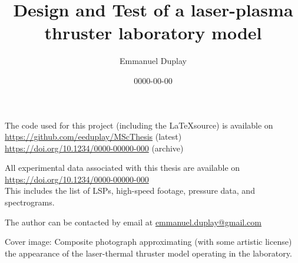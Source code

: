 \documentclass[11pt,a4paper]{report}
\title{Design and Test of a laser-plasma thruster laboratory model}
\author{Emmanuel Duplay}
\date{0000-00-00}
\begin{document}
    \setlength{\parindent}{0pt}
    \setlength{\headheight}{13.6pt}
    
    

    \newpage
    {   \sffamily
        \thispagestyle{empty}
        \vspace*{\fill}

        The code used for this project (including the \LaTeX\hspace{0.67ex}source) is available on \\ \url{https://github.com/eeduplay/MScThesis} (latest) \\ \url{https://doi.org/10.1234/0000-00000-000} (archive)

        All experimental data associated with this thesis are available on \\
        \url{https://doi.org/10.1234/0000-00000-000}\\
        This includes the list of LSPs, high-speed footage, pressure data, and spectrograms.

        The author can be contacted by email at \href{mailto:emmanuel.duplay@gmail.com}{emmanuel.duplay@gmail.com}

        Cover image: Composite photograph approximating (with some artistic license) the appearance of the laser-thermal thruster model operating in the laboratory.
    }

    
    \hypersetup{linkcolor=black}
    \tableofcontents
    
    \listoffigures
    
    \listoftables
    \hypersetup{linkcolor=cyan}
    
    

    \newpage
    

    \newpage

    
    
    
    
    
    
    
\end{document}
